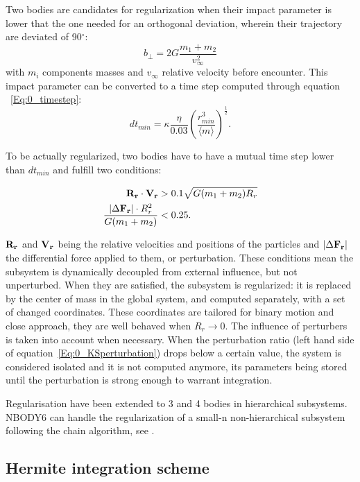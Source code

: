Two bodies are candidates for regularization when their impact parameter is lower that the one needed for an orthogonal deviation, wherein their trajectory are deviated of 90$^\circ$:
\begin{equation}
b_\perp = 2G \frac{m_1 +m_2}{v^2_\infty}
\end{equation}
with $m_i$ components masses and $v_\infty$ relative velocity before encounter. This impact parameter can be converted to a time step computed through equation ~\ref{Eq:0_timestep}:
\begin{equation}
dt_{min} = \kappa \frac{\eta}{0.03} \left( \frac{r^3_{min}}{\langle m \rangle}\right)^\frac{1}{2}.
\end{equation}

To be actually regularized, two bodies have to have a mutual time step lower than $dt_{min}$ and fulfill two conditions:

\begin{align}
\bold{R_r} \cdot \bold{V_r} &> 0.1 \sqrt{ G(m_1+m_2)R_r}\\
\label{Eq:0_KSperturbation}
\frac{\left| \Delta \bold{F_r} \right| \cdot R^2_r}{G(m_1+m_2)} &< 0.25.
\end{align}

$\bold{R_r}$ and $\bold{V_r}$ being the relative velocities and positions of the particles and $\left| \Delta \bold{F_r} \right|$ the differential force applied to them, or perturbation. These conditions mean the subsystem is dynamically decoupled from external influence, but not unperturbed. When they are satisfied, the subsystem is regularized: it is replaced by the center of mass in the global system, and computed separately, with a set of changed coordinates. These coordinates are tailored for binary motion and close approach, they are well behaved when $R_r \rightarrow 0$. The influence of perturbers is taken into account when necessary. When the perturbation ratio (left hand side of equation~\ref{Eq:0_KSperturbation}) drops below a certain value, the system is considered isolated and it is not computed anymore, its parameters being stored until the perturbation is strong enough to warrant integration.

Regularisation have been extended to 3 and 4 bodies in hierarchical subsystems. NBODY6 can handle the regularization of a small-n non-hierarchical subsystem following the chain algorithm, see \cite{Mikkola1993}.


\subsection{Hermite integration scheme}

